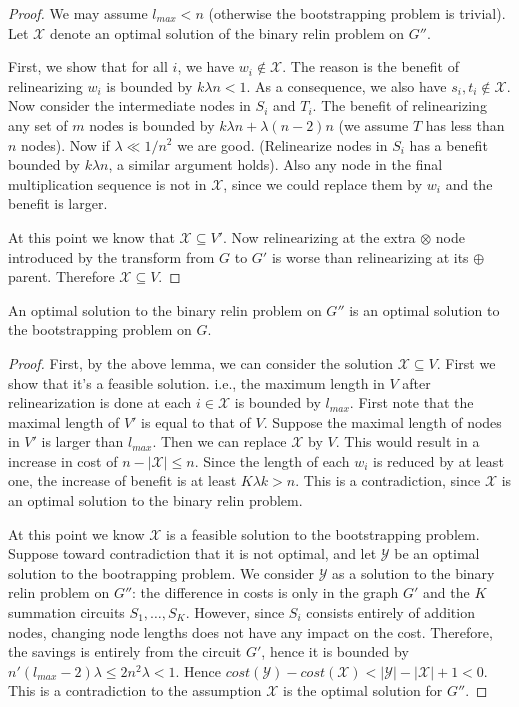 \documentclass[11pt]{article} %
\theoremstyle{plain}
\theoremstyle{definition}
\begin{document}
\begin{proof}
We may assume $l_{max} < n$ (otherwise the bootstrapping problem is trivial). Let $\mathscr{X}$  denote an optimal solution of the binary relin problem on $G''$. 

First, we show that for all $i$, we have $w_i \notin \mathscr{X}$. The reason is the benefit of relinearizing $w_i$ is bounded by $k\lambda n < 1$. 
As a consequence, we also have $s_i, t_i \notin \mathscr{X}$. Now consider the intermediate nodes in $S_i$ and $T_i$.  The benefit of relinearizing any set of $m$ nodes is bounded by $k \lambda n + \lambda (n-2) n $ (we assume $T$ has less than $n$ nodes). Now if $\lambda \ll 1/n^2$ we are good. (Relinearize nodes in $S_i$ has a benefit bounded by $k\lambda n$, a similar argument holds). Also any node in the final multiplication sequence is not in $\mathscr{X}$, since we could replace them by $w_i$ and 
the benefit is larger. 

At this point we know that $\mathscr{X} \subseteq V'$.  Now relinearizing at the extra $\otimes$ node introduced by the transform from $G$ to $G'$ is worse than relinearizing at its $\oplus$ parent. Therefore $\mathscr{X} \subseteq V$. 
\end{proof}

\begin{lemma}
An optimal solution to the binary relin problem on $G''$ is an optimal solution to the bootstrapping problem on $G$. 
\end{lemma}
\begin{proof}
First, by the above lemma, we can consider the solution $\mathscr{X} \subseteq V$. First we show that it's a feasible solution. i.e., the maximum 
length in $V$ after relinearization is done at each $i \in \mathscr{X}$ is bounded by $l_{max}$. First note that the maximal length of $V'$ is equal to that of $V$. Suppose the maximal length of nodes in $V'$ is larger than $l_{max}$. Then we can replace $\mathscr{X}$ by $V$. This would result 
in a increase in cost of $n - |\mathscr{X}| \leq n$. Since the length of each $w_i$ is reduced by at least one, the increase of benefit is at least $K \lambda k > n$. This is a contradiction, since $\mathscr{X}$ is an optimal solution to the 
binary relin problem.  

At this point we know $\mathscr{X}$ is a feasible solution to the bootstrapping problem. Suppose toward contradiction that it is not optimal, and let  $\mathscr{Y}$ be an optimal solution to the bootrapping problem. We consider $\mathscr{Y}$ as a solution to the binary relin problem on $G''$: the difference in costs is only in the graph $G'$ and the $K$ summation circuits $S_1, \ldots, S_K$. However, since $S_i$ consists entirely of addition nodes, changing node lengths does not have any impact on the cost. Therefore, the savings is entirely from the circuit $G'$, hence it is bounded by $n' (l_{max} - 2) \lambda \leq 2n^2 \lambda < 1$. Hence 
$cost(\mathscr{Y}) - cost(\mathscr{X}) < |\mathscr{Y}| - |\mathscr{X}| + 1 < 0$. This is a contradiction to the assumption  $\mathscr{X}$ is the optimal solution for $G''$. 
\end{proof}
\end{document}
